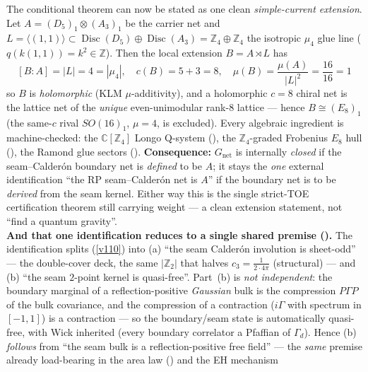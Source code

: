 \documentclass[11pt,a4paper]{article}
\newcommand{\cthree}{c_3}
\newcommand{\Z}{\mathbb Z}
\begin{document}
\begin{keybox}
The conditional theorem can now be stated as one clean \emph{simple-current extension}. Let
$A=(D_5)_1\otimes(A_3)_1$ be the carrier net and $L=\langle(1,1)\rangle\subset\operatorname{Disc}(D_5)\oplus
\operatorname{Disc}(A_3)=\Z_4\oplus\Z_4$ the isotropic $\mu_4$ glue line ($q(k(1,1))=k^2\in\Z$). Then the
local extension $B=A\rtimes L$ has
\[
  \boxed{\ [B:A]=|L|=4=|\mu_4|,\quad c(B)=5{+}3=8,\quad \mu(B)=\frac{\mu(A)}{|L|^2}=\frac{16}{16}=1\ }
\]
so $B$ is \emph{holomorphic} (KLM $\mu$-additivity), and a holomorphic $c{=}8$ chiral net is the lattice net of
the \emph{unique} even-unimodular rank-$8$ lattice --- hence $\boxed{B\cong(E_8)_1}$ (the same-$c$ rival
$SO(16)_1$, $\mu{=}4$, is excluded). Every algebraic ingredient is machine-checked: the $\mathbb C[\Z_4]$ Longo
Q-system (), the $\Z_4$-graded Frobenius $E_8$ hull (),
the Ramond glue sectors (). \textbf{Consequence:} $G_{\mathrm{net}}$ is internally
\emph{closed} if the seam--Calder\'on boundary net is \emph{defined} to be $A$; it stays the \emph{one} external
identification ``the RP seam--Calder\'on net is $A$'' if the boundary net is to be \emph{derived} from the seam
kernel. Either way this is the single strict-TOE certification theorem still carrying weight --- a clean
extension statement, not ``find a quantum gravity''.
\smallskip\\
\noindent\textbf{And that one identification reduces to a single shared premise ().}
The identification splits (\vref{v110}) into (a) ``the seam Calder\'on involution is sheet-odd'' --- the
double-cover deck, the same $|\Z_2|$ that halves $\cthree=\tfrac1{2\cdot4\pi}$ (structural) --- and (b) ``the
seam $2$-point kernel is quasi-free''. Part~(b) is \emph{not independent}: the boundary marginal of a
reflection-positive \emph{Gaussian} bulk is the compression $P\Gamma P$ of the bulk covariance, and the
compression of a contraction ($i\Gamma$ with spectrum in $[-1,1]$) is a contraction --- so the boundary/seam
state is automatically quasi-free, with Wick inherited (every boundary correlator a Pfaffian of $\Gamma_d$).
Hence (b) \emph{follows} from ``the seam bulk is a reflection-positive free field'' --- the \emph{same}
premise already load-bearing in the area law () and the EH mechanism

\end{keybox}
\end{document}
